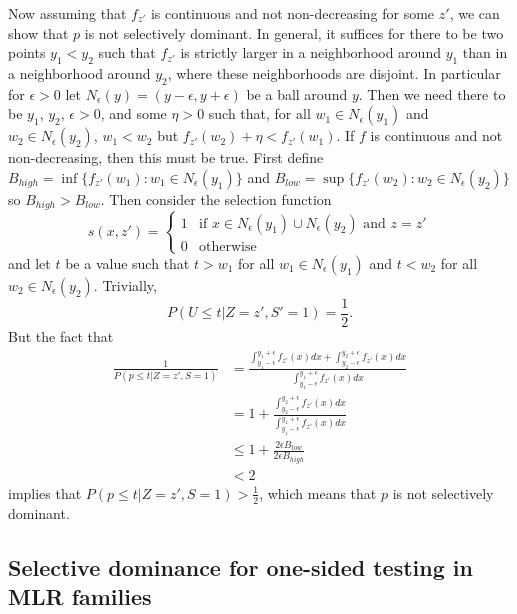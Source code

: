 \documentclass{article}
\begin{document}
\begin{appendix}
Now assuming that $f_{z'}$ is continuous and not non-decreasing for some $z'$, we can show that $p$ is not selectively dominant. In general, it suffices for there to be two points $y_1 < y_2$ such that $f_{z'}$ is strictly larger in a neighborhood around $y_1$ than in a neighborhood around $y_2$, where these neighborhoods are disjoint. In particular for $\epsilon > 0$ let $N_{\epsilon}(y) = (y - \epsilon, y + \epsilon )$ be a ball around $y$. Then we need there to be $y_1$, $y_2$, $\epsilon > 0$, and some $\eta > 0$ such that, for all $w_1 \in N_{\epsilon}(y_1)$ and $w_2 \in N_{\epsilon}(y_2)$, $w_1  < w_2$ but $f_{z'}(w_2) + \eta < f_{z'}(w_1) $. If $f$ is continuous and not non-decreasing, then this must be true. First define $B_{high} = \inf \{f_{z'}(w_1): w_1 \in N_{\epsilon}(y_1)\}$ and  $B_{low} = \sup \{f_{z'}(w_2): w_2 \in N_{\epsilon}(y_2)\}$ so $B_{high}  > B_{low}$. Then consider the selection function 
\begin{equation*}
s(x, z')= \begin{cases}
1 &\text{if } x \in N_{\epsilon}(y_1) \cup N_{\epsilon}(y_2) \text{ and } z=z' \\
0 &\text{otherwise }
\end{cases}
\end{equation*}
and let $t$ be a value such that $t > w_1$ for all $w_1 \in N_{\epsilon}(y_1)$ and $t < w_2$ for all $w_2 \in  N_{\epsilon}(y_2)$. Trivially, 
\begin{equation*}
    P(U \leq t | Z = z', S' = 1) = \frac{1}{2}. 
\end{equation*}
But the fact that 
\begin{align*}
    \frac{1}{P(p \leq t | Z=z', S = 1)} &= \frac{ \int_{y_1 - \epsilon}^{y_1 + \epsilon} f_{z'}(x) dx + \int_{y_2 - \epsilon}^{y_2 + \epsilon} f_{z'}(x) dx  }{\int_{y_1 - \epsilon}^{y_1 + \epsilon} f_{z'}(x) dx}\\
    &= 1 + \frac{ \int_{y_2 - \epsilon}^{y_2 + \epsilon} f_{z'}(x) dx  }{\int_{y_1 - \epsilon}^{y_1 + \epsilon} f_{z'}(x) dx}\\
    &\leq 1 + \frac{ 2\epsilon B_{low}  }{2\epsilon B_{high} }\\
    & < 2
\end{align*}
implies that $P(p \leq t |Z=z',  S = 1) > \frac{1}{2} $, which means that $p$ is not selectively dominant. 
\iffalse 
\subsection{Selective dominance for one-sided testing in MLR families}
\label{sec:mlr_selective_dominance_appdx}


\end{appendix}
\end{document}
